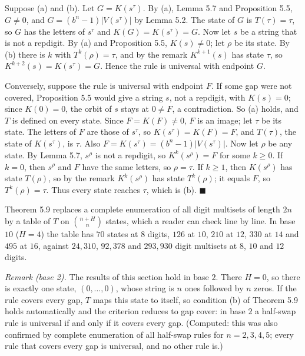 \documentclass[11pt,letterpaper]{article}
\theoremstyle{paperstyle}
\theoremstyle{paperstyledef}
\theoremstyle{paperstylerem}
\begin{document}
Suppose (a) and (b). Let \(G = K(s^\tau)\). By (a), Lemma 5.7 and Proposition 5.5, \(G \ne 0\), and \(G = (b^n-1)|V(s^\tau)|\) by Lemma 5.2. The state of \(G\) is \(T(\tau) = \tau\), so \(G\) has the letters of \(s^\tau\) and \(K(G) = K(s^\tau) = G\). Now let \(s\) be a string that is not a repdigit. By (a) and Proposition 5.5, \(K(s) \ne 0\); let \(\rho\) be its state. By (b) there is \(k\) with \(T^k(\rho) = \tau\), and by the remark \(K^{k+1}(s)\) has state \(\tau\), so \(K^{k+2}(s) = K(s^\tau) = G\). Hence the rule is universal with endpoint \(G\).

Conversely, suppose the rule is universal with endpoint \(F\). If some gap were not covered, Proposition 5.5 would give a string \(s\), not a repdigit, with \(K(s) = 0\); since \(K(0) = 0\), the orbit of \(s\) stays at \(0 \ne F\), a contradiction. So (a) holds, and \(T\) is defined on every state. Since \(F = K(F) \ne 0\), \(F\) is an image; let \(\tau\) be its state. The letters of \(F\) are those of \(s^\tau\), so \(K(s^\tau) = K(F) = F\), and \(T(\tau)\), the state of \(K(s^\tau)\), is \(\tau\). Also \(F = K(s^\tau) = (b^n - 1)|V(s^\tau)|\). Now let \(\rho\) be any state. By Lemma 5.7, \(s^\rho\) is not a repdigit, so \(K^k(s^\rho) = F\) for some \(k \ge 0\). If \(k = 0\), then \(s^\rho\) and \(F\) have the same letters, so \(\rho = \tau\). If \(k \ge 1\), then \(K(s^\rho)\) has state \(T(\rho)\), so by the remark \(K^k(s^\rho)\) has state \(T^k(\rho)\); it equals \(F\), so \(T^k(\rho) = \tau\). Thus every state reaches \(\tau\), which is (b). \(\blacksquare\)

Theorem 5.9 replaces a complete enumeration of all digit multisets of length \(2n\) by a table of \(T\) on \(\binom{n+H}{n}\) states, which a reader can check line by line. In base \(10\) (\(H = 4\)) the table has \(70\) states at \(8\) digits, \(126\) at \(10\), \(210\) at \(12\), \(330\) at \(14\) and \(495\) at \(16\), against \(24{,}310\), \(92{,}378\) and \(293{,}930\) digit multisets at \(8\), \(10\) and \(12\) digits.

\emph{Remark (base 2).} The results of this section hold in base \(2\). There \(H = 0\), so there is exactly one state, \((0, \dots, 0)\), whose string is \(n\) ones followed by \(n\) zeros. If the rule covers every gap, \(T\) maps this state to itself, so condition (b) of Theorem 5.9 holds automatically and the criterion reduces to gap cover: in base \(2\) a half-swap rule is universal if and only if it covers every gap. (Computed: this was also confirmed by complete enumeration of all half-swap rules for \(n = 2, 3, 4, 5\); every rule that covers every gap is universal, and no other rule is.)
\end{document}
